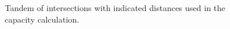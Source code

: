 \documentclass[a4paper]{article}
\theoremstyle{definition}
\theoremstyle{plain}
\begin{document}
\begin{figure}[b]
  \centering
  \caption{Tandem of intersections with indicated distances used in the capacity
    calculation.}
  \label{fig:tandem_annotated}
\end{figure}
\end{document}

